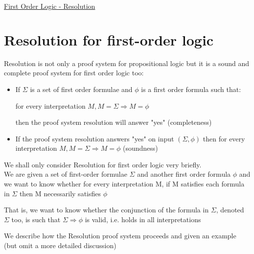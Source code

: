 \documentclass{article}[18pt]
\begin{document}
\begin{center}
\underline{\huge First Order Logic - Resolution}
\end{center}
\section{Resolution for first-order logic}
Resolution is not only a proof system for propositional logic but it is a sound and complete proof system for first order logic too:
\begin{itemize}
	\item If $\Sigma$ is a set of first order formulae and $\phi$ is a first order formula such that:
	\begin{center}
	for every interpretation $M , M = \Sigma \Rightarrow M = \phi$
	\end{center}
	then the proof system resolution will answer "yes" (completeness)
	\item If the proof system resolution answers "yes" on input $(\Sigma,\phi)$ then for every interpretation $M , M = \Sigma \Rightarrow M = \phi$ (soundness)
\end{itemize}
We shall only consider Resolution for first order logic very briefly.\\
We are given a set of first-order formulae $\Sigma$ and another first order formula $\phi$ and we want to know whether for every interpretation M, if M satisfies each formula in $\Sigma$ then M necessarily satisfies $\phi$
\\
\begin{adjustwidth}{2em}{2em}
\begin{center}
	That is, we want to know whether the conjunction of the formula in $\Sigma$, denoted $\Sigma$ too, is such that $\Sigma\Rightarrow\phi$ is valid, i.e. holds in all interpretations
\end{center}
\end{adjustwidth}
We describe how the Resolution proof system proceeds and given an example (but omit a more detailed discussion)
\end{document}
